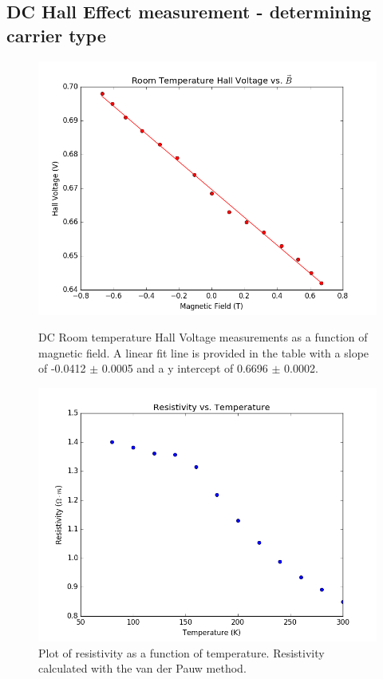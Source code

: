 \documentclass[twocolumn]{article}
\begin{document}
\subsection{DC Hall Effect measurement - determining carrier type}
\begin{figure}
\begin{minipage}[t]{0.46\textwidth}
\includegraphics[width=\linewidth]{room-temperature-dc.png}
\caption{DC Room temperature Hall Voltage measurements as a function of 
magnetic field. A linear fit line is provided in the table with a slope of 
-0.0412 $\pm$ 0.0005 and a y intercept of 0.6696 $\pm$ 0.0002.}
\label{fig:13}
\end{minipage}
\hfill
\begin{minipage}[t]{0.46\textwidth}
\includegraphics[width=\linewidth]{resistivity-vs-temp.png}
\caption{Plot of resistivity as a function of temperature. Resistivity 
calculated with the van der Pauw method.}
\label{fig:14}
\end{minipage}
\end{figure}
\end{document}
